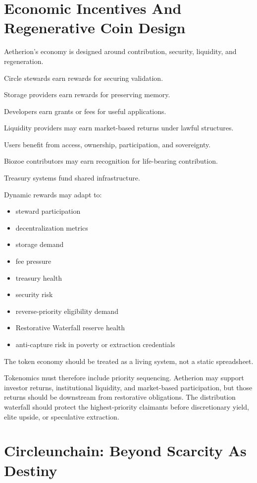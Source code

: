 ﻿\documentclass[12pt]{article}
\begin{document}
\section{Economic Incentives And Regenerative Coin Design}


Aetherion's economy is designed around contribution, security, liquidity, and regeneration.

Circle stewards earn rewards for securing validation.

Storage providers earn rewards for preserving memory.

Developers earn grants or fees for useful applications.

Liquidity providers may earn market-based returns under lawful structures.

Users benefit from access, ownership, participation, and sovereignty.

Biozoe contributors may earn recognition for life-bearing contribution.

Treasury systems fund shared infrastructure.

Dynamic rewards may adapt to:

\begin{itemize}
  \item steward participation
  \item decentralization metrics
  \item storage demand
  \item fee pressure
  \item treasury health
  \item security risk
  \item reverse-priority eligibility demand
  \item Restorative Waterfall reserve health
  \item anti-capture risk in poverty or extraction credentials
\end{itemize}

The token economy should be treated as a living system, not a static spreadsheet.

Tokenomics must therefore include priority sequencing. Aetherion may support investor returns, institutional liquidity, and market-based participation, but those returns should be downstream from restorative obligations. The distribution waterfall should protect the highest-priority claimants before discretionary yield, elite upside, or speculative extraction.

\section{Circleunchain: Beyond Scarcity As Destiny}
\end{document}
